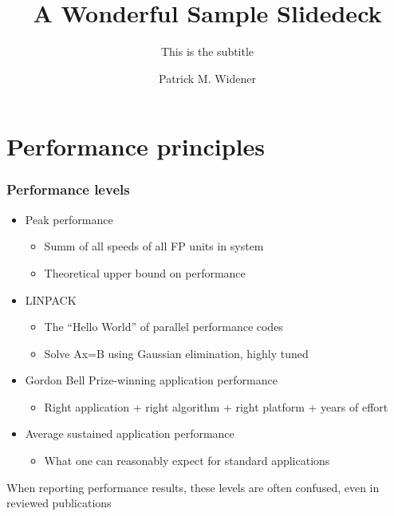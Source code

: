 \documentclass{beamer}
\title{A Wonderful Sample Slidedeck}
\subtitle{This is the subtitle}
\author{Patrick M. Widener}
\begin{document}
%
%

\begin{frame}
\titlepage
\end{frame}

\section{Performance principles}

\begin{frame}
\frametitle{Performance levels}

\begin{itemize}
\item Peak performance
\begin{itemize}
\item Summ of all speeds of all FP units in system
\item Theoretical upper bound on performance
\end{itemize}

\item LINPACK
\begin{itemize}
\item The ``Hello World'' of parallel performance codes
\item Solve Ax=B using Gaussian elimination, highly tuned
\end{itemize}

\item Gordon Bell Prize-winning application performance
\begin{itemize}
\item Right application + right algorithm + right platform + years of
  effort
\end{itemize}

\item Average sustained application performance
\begin{itemize}
\item What one can reasonably expect for standard applications
\end{itemize}

\end{itemize}

\begin{beamerboxesrounded}{When reporting performance results, these levels are often confused,
even in reviewed publications}
\end{beamerboxesrounded}
\end{frame}
\end{document}
